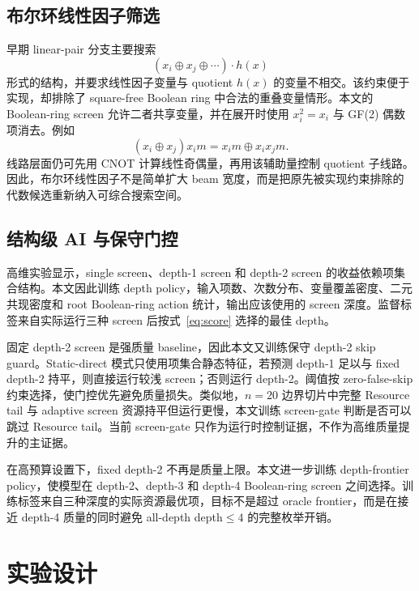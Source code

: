 \documentclass[UTF8,fontset=macnew,11pt]{ctexart}
\newcommand{\screen}{Boolean-ring screen}
\newcommand{\xor}{\ensuremath{\oplus}}
\begin{document}
\subsection{布尔环线性因子筛选}

早期 linear-pair 分支主要搜索
\begin{equation}
  (x_i\xor x_j\xor\cdots)\cdot h(x)
  \label{eq:linear-factor}
\end{equation}
形式的结构，并要求线性因子变量与 quotient $h(x)$ 的变量不相交。该约束便于实现，却排除了 square-free Boolean ring 中合法的重叠变量情形。本文的 \screen{} 允许二者共享变量，并在展开时使用 $x_i^2=x_i$ 与 GF(2) 偶数项消去。例如
\begin{equation}
  (x_i\xor x_j)x_i m = x_i m \xor x_i x_j m .
  \label{eq:boolean-ring}
\end{equation}
线路层面仍可先用 CNOT 计算线性奇偶量，再用该辅助量控制 quotient 子线路。因此，布尔环线性因子不是简单扩大 beam 宽度，而是把原先被实现约束排除的代数候选重新纳入可综合搜索空间。

\subsection{结构级 AI 与保守门控}

高维实验显示，single screen、depth-1 screen 和 depth-2 screen 的收益依赖项集合结构。本文因此训练 depth policy，输入项数、次数分布、变量覆盖密度、二元共现密度和 root Boolean-ring action 统计，输出应该使用的 screen 深度。监督标签来自实际运行三种 screen 后按式~\eqref{eq:score} 选择的最佳 depth。

固定 depth-2 screen 是强质量 baseline，因此本文又训练保守 depth-2 skip guard。Static-direct 模式只使用项集合静态特征，若预测 depth-1 足以与 fixed depth-2 持平，则直接运行较浅 screen；否则运行 depth-2。阈值按 zero-false-skip 约束选择，使门控优先避免质量损失。类似地，$n=20$ 边界切片中完整 Resource tail 与 adaptive screen 资源持平但运行更慢，本文训练 screen-gate 判断是否可以跳过 Resource tail。当前 screen-gate 只作为运行时控制证据，不作为高维质量提升的主证据。

在高预算设置下，fixed depth-2 不再是质量上限。本文进一步训练 depth-frontier policy，使模型在 depth-2、depth-3 和 depth-4 \screen{} 之间选择。训练标签来自三种深度的实际资源最优项，目标不是超过 oracle frontier，而是在接近 depth-4 质量的同时避免 all-depth depth$\leq4$ 的完整枚举开销。

\section{实验设计}
\end{document}
